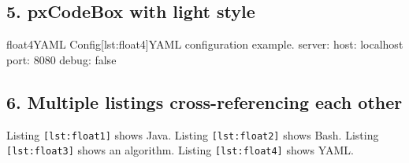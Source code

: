 \documentclass{article}
\begin{document}
\subsection*{5. pxCodeBox with light style}
\begin{pxCodeBox}{float4}{YAML Config}{[lst:float4]}{YAML configuration example.}
server:
  host: localhost
  port: 8080
  debug: false
\end{pxCodeBox}

\subsection*{6. Multiple listings cross-referencing each other}
Listing \texttt{[lst:float1]} shows Java.
Listing \texttt{[lst:float2]} shows Bash.
Listing \texttt{[lst:float3]} shows an algorithm.
Listing \texttt{[lst:float4]} shows YAML.
\end{document}
